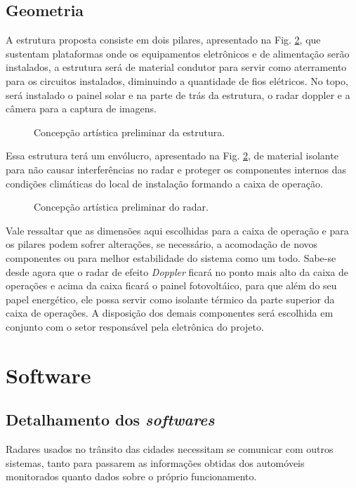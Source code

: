 \subsection{Geometria}
A estrutura proposta consiste em dois pilares, apresentado na Fig. \ref{fig:radop}, que sustentam plataformas onde os equipamentos eletrônicos e de alimentação serão instalados, a estrutura será de material condutor para servir como aterramento para os circuitos instalados, diminuindo a quantidade de fios elétricos. No topo, será instalado o painel solar e na parte de trás da estrutura, o radar doppler e a câmera para a captura de imagens.   

\begin{figure}[h]
    \caption{\label{fig:estrutura} Concepção artística preliminar da estrutura.}
\end{figure}
\pagebreak
Essa estrutura terá um envólucro, apresentado na Fig. \ref{fig:radop}, de material isolante para não causar interferências no radar e proteger os componentes internos das condições climáticas do local de instalação formando a caixa de operação.


\begin{figure}[h]
    \caption{\label{fig:radop} Concepção artística preliminar do radar.}
\end{figure}

Vale ressaltar que as dimensões aqui escolhidas para a caixa de operação e para os pilares podem sofrer alterações, se necessário, a acomodação de novos componentes ou para melhor estabilidade do sistema como um todo. Sabe-se desde agora que o radar de efeito \textit{Doppler} ficará no ponto mais alto da caixa de operações e acima da caixa ficará o painel fotovoltáico, para que além do seu papel energético, ele possa servir como isolante térmico da parte superior da caixa de operações. A disposição dos demais componentes será escolhida em conjunto com o setor responsável pela eletrônica do projeto.

\section{Software}

\subsection{Detalhamento dos \emph{softwares}}
Radares usados no trânsito das cidades necessitam se comunicar com outros sistemas, tanto para passarem as informações obtidas dos automóveis monitorados quanto dados sobre o próprio funcionamento.

